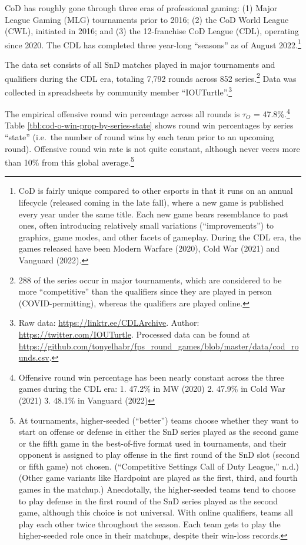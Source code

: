 \documentclass{article}
\begin{document}
CoD has roughly gone through three eras of professional gaming: (1)
Major League Gaming (MLG) tournaments prior to 2016; (2) the CoD World
League (CWL), initiated in 2016; and (3) the 12-franchise CoD League
(CDL), operating since 2020. The CDL has completed three year-long
``seasons'' as of August 2022.\footnote{CoD is fairly unique compared to
  other esports in that it runs on an annual lifecycle (released coming
  in the late fall), where a new game is published every year under the
  same title. Each new game bears resemblance to past ones, often
  introducing relatively small variations (``improvements'') to
  graphics, game modes, and other facets of gameplay. During the CDL
  era, the games released have been Modern Warfare (2020), Cold War
  (2021) and Vanguard (2022).}

The data set consists of all SnD matches played in major tournaments and
qualifiers during the CDL era, totaling 7,792 rounds across 852
series.\footnote{288 of the series occur in major tournaments, which are
  considered to be more ``competitive'' than the qualifiers since they
  are played in person (COVID-permitting), whereas the qualifiers are
  played online.} Data was collected in spreadsheets by community member
``IOUTurtle''.\footnote{Raw data: \url{https://linktr.ee/CDLArchive}.
  Author: \url{https://twitter.com/IOUTurtle}. Processed data can be
  found at
  \url{https://github.com/tonyelhabr/fps_round_games/blob/master/data/cod_rounds.csv}.}

The empirical offensive round win percentage across all rounds is
\(\tau_O\) = 47.8\%.\footnote{Offensive round win percentage has been
  nearly constant across the three games during the CDL era: 1. 47.2\%
  in MW (2020) 2. 47.9\% in Cold War (2021) 3. 48.1\% in Vanguard (2022)}
Table \ref{tbl:cod-o-win-prop-by-series-state} shows round win
percentages by series ``state'' (i.e.~the number of round wins by each
team prior to an upcoming round). Offensive round win rate is not quite
constant, although never veers more than 10\% from this global
average.\footnote{At tournaments, higher-seeded (``better'') teams
  choose whether they want to start on offense or defense in either the
  SnD series played as the second game or the fifth game in the
  best-of-five format used in tournaments, and their opponent is
  assigned to play offense in the first round of the SnD slot (second or
  fifth game) not chosen. ({``Competitive Settings \textbar{} Call of
  Duty League,''} n.d.) (Other game variants like Hardpoint are played
  as the first, third, and fourth games in the matchup.) Anecdotally,
  the higher-seeded teams tend to choose to play defense in the first
  round of the SnD series played as the second game, although this
  choice is not universal. With online qualifiers, teams all play each
  other twice throughout the season. Each team gets to play the
  higher-seeded role once in their matchups, despite their win-loss
  records.}
\end{document}
